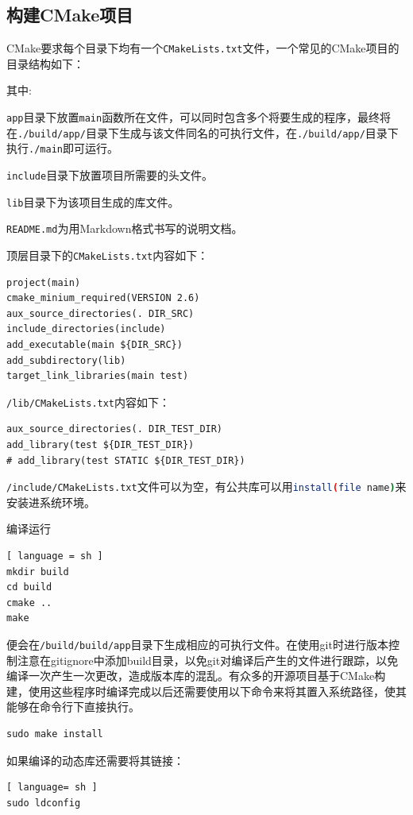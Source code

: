		\subsection{构建CMake项目}
			\par CMake要求每个目录下均有一个\lstinline{CMakeLists.txt}文件，一个常见的CMake项目的目录结构如下：
			\par 其中:
			\par \lstinline{app}目录下放置\lstinline{main}函数所在文件，可以同时包含多个将要生成的程序，最终将在\lstinline{./build/app/}目录下生成与该文件同名的可执行文件，在\lstinline{./build/app/}目录下执行\lstinline{./main}即可运行。
			\par \lstinline{include}目录下放置项目所需要的头文件。
			\par \lstinline{lib}目录下为该项目生成的库文件。
			\par \lstinline{README.md}为用Markdown格式书写的说明文档。
			\par 顶层目录下的\lstinline{CMakeLists.txt}内容如下：
			\begin{lstlisting}
project(main)
cmake_minium_required(VERSION 2.6)
aux_source_directories(. DIR_SRC)
include_directories(include)
add_executable(main ${DIR_SRC})
add_subdirectory(lib)
target_link_libraries(main test)
			\end{lstlisting}
			\par \lstinline{/lib/CMakeLists.txt}内容如下：
			\begin{lstlisting}
aux_source_directories(. DIR_TEST_DIR)
add_library(test ${DIR_TEST_DIR})
# add_library(test STATIC ${DIR_TEST_DIR})
			\end{lstlisting}
			\par \lstinline{/include/CMakeLists.txt}文件可以为空，有公共库可以用\lstinline[language=sh]{install(file name)}来安装进系统环境。
			\par 编译运行
			\begin{lstlisting}[ language = sh ]
mkdir build
cd build
cmake ..
make
			\end{lstlisting}
			\par 便会在\lstinline{/build/build/app}目录下生成相应的可执行文件。在使用git时进行版本控制注意在gitignore中添加build目录，以免git对编译后产生的文件进行跟踪，以免编译一次产生一次更改，造成版本库的混乱。有众多的开源项目基于CMake构建，使用这些程序时编译完成以后还需要使用以下命令来将其置入系统路径，使其能够在命令行下直接执行。
			\begin{lstlisting}
sudo make install
			\end{lstlisting}
			\par 如果编译的动态库还需要将其链接：
			\begin{lstlisting}[ language= sh ]
sudo ldconfig
			\end{lstlisting}
